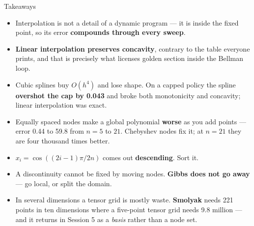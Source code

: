 \begin{frame}{Takeaways}
\begin{takeawaybox}
\begin{itemize}\small
  \item Interpolation is not a detail of a dynamic program --- it is inside the fixed point, so its error \textbf{compounds through every sweep}.
  \item \textbf{Linear interpolation preserves concavity}, contrary to the table everyone prints, and that is precisely what licenses golden section inside the Bellman loop.
  \item Cubic splines buy $O(h^{4})$ and lose shape. On a capped policy the spline \textbf{overshot the cap by 0.043} and broke both monotonicity and concavity; linear interpolation was exact.
  \item Equally spaced nodes make a global polynomial \textbf{worse} as you add points --- error 0.44 to 59.8 from $n=5$ to $21$. Chebyshev nodes fix it; at $n=21$ they are four thousand times better.
  \item $x_i=\cos((2i-1)\pi/2n)$ comes out \textbf{descending}. Sort it.
  \item A discontinuity cannot be fixed by moving nodes. \textbf{Gibbs does not go away} --- go local, or split the domain.
  \item In several dimensions a tensor grid is mostly waste. \textbf{Smolyak} needs 221 points in ten dimensions where a five-point tensor grid needs 9.8 million --- and it returns in Session 5 as a \emph{basis} rather than a node set.
\end{itemize}
\end{takeawaybox}
\end{frame}

